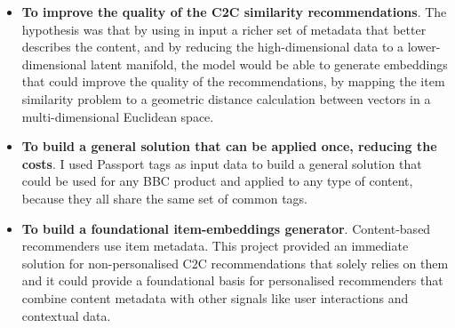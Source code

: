 \begin{itemize}
  \item \textbf{To improve the quality of the C2C similarity recommendations}. The hypothesis was that by using in input a richer set of metadata that
  better describes the content, and by reducing the high-dimensional data to a lower-dimensional latent manifold,
  the model would be able to generate embeddings that could improve the quality of the recommendations, by mapping the
  item similarity problem to a geometric distance calculation between vectors in a multi-dimensional Euclidean space.
  \item \textbf{To build a general solution that can be applied once, reducing the costs}. I used Passport tags as input data to build a general solution
  that could be used for any BBC product and applied to any type of content, because they all share the same set of common tags.
  \item \textbf{To build a foundational item-embeddings generator}. Content-based recommenders
  use item metadata. This project provided an immediate solution for non-personalised C2C recommendations that solely relies on them and
  it could provide a foundational basis for personalised recommenders that combine content metadata with other signals like user interactions
  and contextual data.
\end{itemize}
